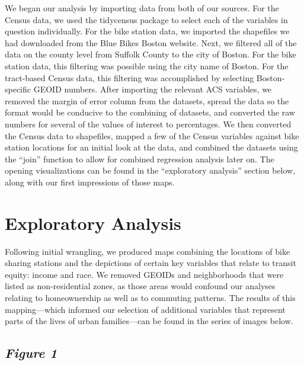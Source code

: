 \documentclass[
  12pt,
]{article}
\begin{document}
\begin{longtable}[]
We began our analysis by importing data from both of our sources. For
the Census data, we used the tidycensus package to select each of the
variables in question individually. For the bike station data, we
imported the shapefiles we had downloaded from the Blue Bikes Boston
website. Next, we filtered all of the data on the county level from
Suffolk County to the city of Boston. For the bike station data, this
filtering was possible using the city name of Boston. For the
tract-based Census data, this filtering was accomplished by selecting
Boston-specific GEOID numbers. After importing the relevant ACS
variables, we removed the margin of error column from the datasets,
spread the data so the format would be conducive to the combining of
datasets, and converted the raw numbers for several of the values of
interest to percentages. We then converted the Census data to
shapefiles, mapped a few of the Census variables against bike station
locations for an initial look at the data, and combined the datasets
using the ``join'' function to allow for combined regression analysis
later on. The opening visualizations can be found in the ``exploratory
analysis'' section below, along with our first impressions of those
maps.

\newpage

\hypertarget{exploratory-analysis}{%
\section{Exploratory Analysis}\label{exploratory-analysis}}

Following initial wrangling, we produced maps combining the locations of
bike sharing stations and the depictions of certain key variables that
relate to transit equity: income and race. We removed GEOIDs and
neighborhoods that were listed as non-residential zones, as those areas
would confound our analyses relating to homeownership as well as to
commuting patterns. The results of this mapping---which informed our
selection of additional variables that represent parts of the lives of
urban families---can be found in the series of images below.

\hypertarget{figure-1}{%
\subsection{\texorpdfstring{\emph{Figure 1}}{Figure 1}}\label{figure-1}}


\end{longtable}
\end{document}
